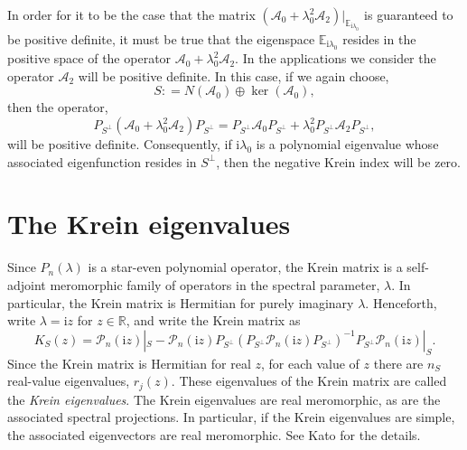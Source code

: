 \documentclass[review,onefignum,onetabnum]{siamart171218}
\newcommand{\E}{\mathbb{E}}
\newcommand{\R}{\mathbb{R}}
\def\ker{\mathop\mathrm{ker}\nolimits}
\def\coloneqq{\mathrel{\mathop:}=}
\newcommand{\rmi}{\mathrm{i}}
\newcommand{\calA}{\mathcal{A}}
\newcommand{\calP}{\mathcal{P}}
\newcommand{\vK}{\bm{\mathit{K}}}
\begin{document}
In order for it to be the case that the matrix
$(\calA_0+\lambda_0^2\calA_2)|_{\E_{\rmi\lambda_0}}$ is guaranteed to be
positive definite, it must be true that the eigenspace $\E_{\rmi\lambda_0}$
resides in the positive space of the operator $\calA_0+\lambda_0^2\calA_2$.
In the applications we consider the operator $\calA_2$ will be positive
definite. In this case, if we again choose,
\[
S\coloneqq N(\calA_0)\oplus\ker(\calA_0),
\]
then the operator,
\[
P_{S^\perp}\left(\calA_0+\lambda_0^2\calA_2\right)P_{S^\perp}=
P_{S^\perp}\calA_0P_{S^\perp}+\lambda_0^2P_{S^\perp}\calA_2P_{S^\perp},
\]
will be positive definite. Consequently, if $\rmi\lambda_0$ is a polynomial
eigenvalue whose associated eigenfunction resides in $S^\perp$, then the
negative Krein index will be zero. %
%

\section{The Krein eigenvalues}\label{s:3}

Since $P_n(\lambda)$ is a star-even polynomial operator, the Krein matrix is a self-adjoint meromorphic family of operators in the spectral parameter, $\lambda$. In particular, the Krein matrix is Hermitian for purely imaginary $\lambda$.
Henceforth, write $\lambda=\rmi z$ for
$z\in\R$, and write the Krein matrix as
\[
\vK_S(z)=\calP_n(\rmi z)|_S-%
\calP_n(\rmi z)P_{S^\perp}(P_{S^\perp}\calP_n(\rmi z)P_{S^\perp})^{-1}P_{S^\perp}\calP_n(\rmi z)|_{S}.
\]
Since the Krein matrix is Hermitian for real $z$, for each value of
$z$ there are $n_S$ real-value eigenvalues, $r_j(z)$. These eigenvalues of
the Krein matrix are called the \textit{Krein eigenvalues}. The Krein eigenvalues are real meromorphic, as are the associated spectral projections. In particular, if the Krein eigenvalues are simple, the associated eigenvectors are real meromorphic. See Kato \cite[Chapter~VII.3]{kato:ptf80} for the details.
\end{document}
